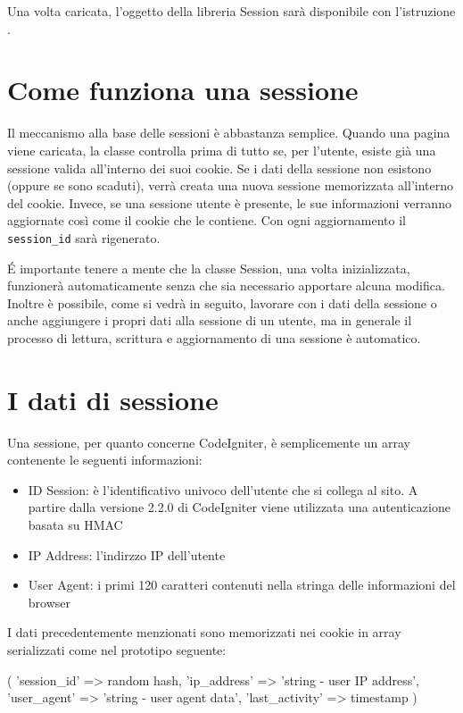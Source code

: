Una volta caricata, l'oggetto della libreria Session sarà disponibile con l'istruzione .

\section*{Come funziona una sessione}

Il meccanismo alla base delle sessioni è abbastanza semplice. Quando una pagina viene caricata, la classe controlla prima di tutto se, per l'utente, esiste già una sessione valida all'interno dei suoi cookie. Se i dati della sessione non esistono (oppure se sono scaduti), verrà creata una nuova sessione memorizzata all'interno del cookie. Invece, se una sessione utente è presente, le sue informazioni verranno aggiornate così come il cookie che le contiene. Con ogni aggiornamento il \verb|session_id| sarà rigenerato.

\'E importante tenere a mente che la classe Session, una volta inizializzata, funzionerà automaticamente senza che sia necessario apportare alcuna modifica. Inoltre è possibile, come si vedrà in seguito, lavorare con i dati della sessione o anche aggiungere i propri dati alla sessione di un utente, ma in generale il processo di lettura, scrittura e aggiornamento di una sessione è automatico.

\section*{I dati di sessione}

Una sessione, per quanto concerne CodeIgniter, è semplicemente un array contenente le seguenti informazioni:

\begin{itemize}
\item ID Session: è l'identificativo univoco dell'utente che si collega al sito. A partire dalla versione 2.2.0 di CodeIgniter viene utilizzata una autenticazione basata su \ac{HMAC}
\item IP Address: l'indirzzo IP dell'utente
\item User Agent: i primi 120 caratteri contenuti nella stringa delle informazioni del browser
\end{itemize}

I dati precedentemente menzionati sono memorizzati nei cookie in array serializzati come nel prototipo seguente:

\begin{code}
[array]
(
     'session_id'    => random hash,
     'ip_address'    => 'string - user IP address',
     'user_agent'    => 'string - user agent data',
     'last_activity' => timestamp
)
\end{code}

